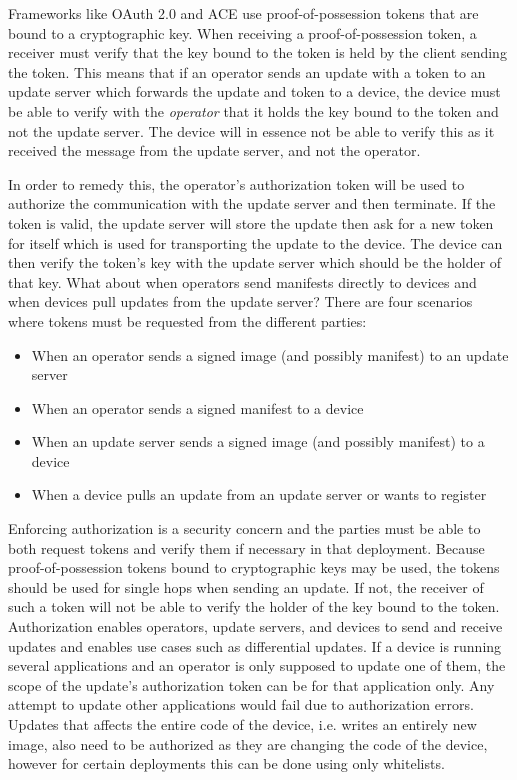 \documentclass[0-thesis.tex]{subfiles}
\begin{document}
Frameworks like OAuth 2.0 and ACE use proof-of-possession tokens that are bound to a
cryptographic key. When receiving a proof-of-possession token, a receiver must verify that
the key bound to the token is held by the client sending the token. This means that if an
operator sends an update with a token to an update server which forwards the update and
token to a device, the device must be able to verify with the \textit{operator} that it
holds the key bound to the token and not the update server. The device will in essence not
be able to verify this as it received the message from the update server, and not the
operator.

In order to remedy this, the operator's authorization token will be used to authorize the
communication with the update server and then terminate. If the token is valid, the update
server will store the update then ask for a new token for itself which is used for
transporting the update to the device. The device can then verify the token's key with the
update server which should be the holder of that key. What about when operators send
manifests directly to devices and when devices pull updates from the update server? There
are four scenarios where tokens must be requested from the different parties:

\begin{itemize}
    \item When an operator sends a signed image (and possibly manifest) to an update
            server
    \item When an operator sends a signed manifest to a device
    \item When an update server sends a signed image (and possibly manifest) to a device
    \item When a device pulls an update from an update server or wants to register
\end{itemize}

Enforcing authorization is a security concern and the parties must be able to both request
tokens and verify them if necessary in that deployment. Because proof-of-possession tokens
bound to cryptographic keys may be used, the tokens should be used for single hops when
sending an update. If not, the receiver of such a token will not be able to verify the
holder of the key bound to the token. Authorization enables operators, update servers, and
devices to send and receive updates and enables use cases such as differential updates. If
a device is running several applications and an operator is only supposed to update one of
them, the scope of the update's authorization token can be for that application only. Any
attempt to update other applications would fail due to authorization errors. Updates that
affects the entire code of the device, i.e. writes an entirely new image, also need to be
authorized as they are changing the code of the device, however for certain deployments
this can be done using only whitelists.
\end{document}
